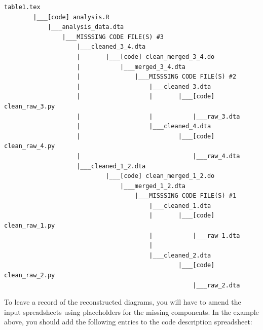 \documentclass[]{book}
\begin{document}
\begin{verbatim}
table1.tex
        |___[code] analysis.R
            |___analysis_data.dta
                |___MISSSING CODE FILE(S) #3
                    |___cleaned_3_4.dta
                    |       |___[code] clean_merged_3_4.do
                    |           |___merged_3_4.dta
                    |               |___MISSSING CODE FILE(S) #2
                    |                   |___cleaned_3.dta
                    |                   |       |___[code] clean_raw_3.py
                    |                   |           |___raw_3.dta    
                    |                   |___cleaned_4.dta
                    |                           |___[code] clean_raw_4.py
                    |                               |___raw_4.dta
                    |___cleaned_1_2.dta
                            |___[code] clean_merged_1_2.do
                                |___merged_1_2.dta
                                    |___MISSSING CODE FILE(S) #1
                                        |___cleaned_1.dta
                                        |       |___[code] clean_raw_1.py
                                        |           |___raw_1.dta
                                        |   
                                        |___cleaned_2.dta
                                                |___[code] clean_raw_2.py
                                                    |___raw_2.dta
\end{verbatim}

To leave a record of the reconstructed diagrams, you will have to amend the input spreadsheets using placeholders for the missing components. In the example above, you should add the following entries to the code description spreadsheet:
\end{document}
